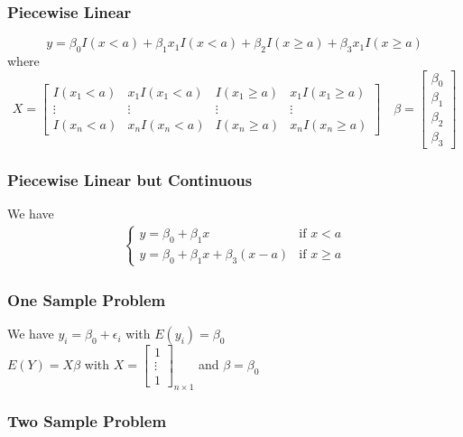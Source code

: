 \documentclass[11pt]{article}
\newcommand{\cv}[1]{\begin{bmatrix} #1 \end{bmatrix}}
\begin{document}
\subsubsection{Piecewise Linear}
\[y = \beta_0I(x<a) + \beta_1x_1I(x<a) + \beta_2I(x\geq a) + \beta_3x_1I(x\geq a)\]
where 
\[X = \cv{I(x_1<a) &x_1I(x_1<a) &I(x_1\geq a) &x_1I(x_1\geq a) \\\vdots &\vdots &\vdots &\vdots \\I(x_n<a) &x_nI(x_n<a) &I(x_n\geq a) &x_nI(x_n\geq a)}\quad \beta = \cv{\beta_0\\\beta_1\\\beta_2\\\beta_3}\]
\subsubsection{Piecewise Linear but Continuous}
We have 
\begin{align*}
    \begin{cases}
        y = \beta_0+\beta_1 x &\text{if } x<a \\
        y = \beta_0+\beta_1 x + \beta_3(x-a) &\text{if } x\geq a
    \end{cases}
\end{align*}
\subsubsection{One Sample Problem}
We have $y_i = \beta_0 + \epsilon_i$ with $E(y_i) = \beta_0$ \\
$E(Y) = X\beta$ with $X = \cv{1\\\vdots\\1}_{n\times 1}$ and $\beta = \beta_0$
\subsubsection{Two Sample Problem}
\end{document}

